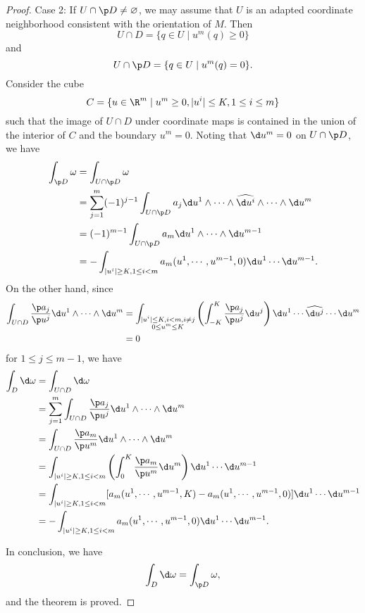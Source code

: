 \documentclass[11pt]{article}
\begin{document}
\begin{proof}
    Case 2: If $U \cap \p D \neq \varnothing$, we may assume that $U$ is an adapted coordinate neighborhood consistent with the orientation of $M$. Then $$U \cap D = \{q \in U \mid u^m(q) \ge 0\}$$ and $$U \cap \p D = \{q \in U \mid u^m(q) = 0\}.$$ Consider the cube $$C = \{u \in \R^m \mid u^m \ge 0, |u^i| \le K, 1 \le i \le m\}$$ such that the image of $U \cap D$ under coordinate maps is contained in the union of the interior of $C$ and the boundary $u^m = 0$. Noting that $\d u^m = 0$ on $U \cap \p D$, we have 
    \begin{align*}
        \int_{\p D}\omega &= \int_{U \cap \p D}\omega \\
        &= \sum_{j=1}^m (-1)^{j-1}\int_{U \cap \p D} a_j \d u^1 \wedge \cdots \wedge \widehat{\d u^i} \wedge \cdots \wedge \d u^m \\
        &= (-1)^{m-1} \int_{U \cap \p D}a_m \d u^1 \wedge \cdots \wedge \d u^{m-1} \\ 
        &= -\int_{|u^i| \ge K, 1 \le i < m} a_m(u^1, \cdots, u^{m-1}, 0)\d u^1 \cdots \d u^{m-1}.
    \end{align*}
    On the other hand, since
    \begin{align*}
        \int_{U \cap D} \frac{\p a_j}{\p u^j} \d u^1 \wedge \cdots \wedge \d u^m &= \int_{\substack{|u^i| \le K, i < m, i \neq j \\ 0 \le u^m \le K}}\left(\int_{-K}^K \frac{\p a_j}{\p u^j} \d u^j\right)\d u^1 \cdots \widehat{\d u^j} \cdots \d u^m \\
        &= 0
    \end{align*} for $1 \le j \le m - 1$, we have
    \begin{align*}
        \int_{D} \d\omega &= \int_{U \cap D}\d\omega \\
        &= \sum_{j=1}^m\int_{U \cap D} \frac{\p a_j}{\p u^j}\d u^1 \wedge \cdots \wedge \d u^m \\
        &= \int_{U \cap D} \frac{\p a_m}{\p u^m}\d u^1 \wedge \cdots \wedge \d u^m \\
        &= \int_{|u^i| \ge K, 1 \le i < m}\left(\int_0^K \frac{\p a_m}{\p u^m}\d u^m\right)\d u^1 \cdots \d u^{m-1} \\
        &= \int_{|u^i| \ge K, 1 \le i < m}[a_m(u^1, \cdots, u^{m-1}, K) - a_m(u^1, \cdots, u^{m-1}, 0)]\d u^1 \cdots \d u^{m-1} \\
        &= -\int_{|u^i| \ge K, 1 \le i < m} a_m(u^1, \cdots, u^{m-1}, 0)\d u^1 \cdots \d u^{m-1}.
    \end{align*}

    In conclusion, we have $$\int_{D} \d\omega = \int_{\p D}\omega,$$ and the theorem is proved. 
\end{proof}
\end{document}
